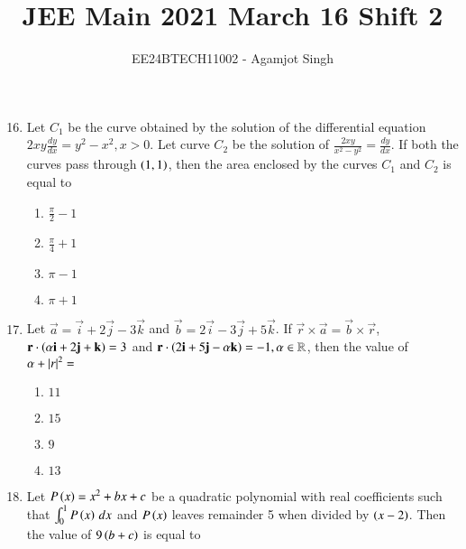 \documentclass[journal,onecolumn]{IEEEtran}
\theoremstyle{remark}
\begin{document}

\vspace{3cm}

\title{JEE Main 2021 March 16 Shift 2}
\author{EE24BTECH11002 - Agamjot Singh}
\maketitle

\renewcommand{\thefigure}{\theenumi}
\renewcommand{\thetable}{\theenumi}

\begin{enumerate}
    \setcounter{enumi}{15}

    \item Let $C_1$ be the curve obtained by the solution of the differential equation $2xy\frac{dy}{dx} = y^2 - x^2, x > 0$. Let curve $C_2$ be the solution of $\frac{2xy}{x^2 - y^2} = \frac{dy}{dx}$. If both the curves pass through $\left(1, 1\right)$, then the area enclosed by the curves $C_1$ and $C_2$ is equal to

	\begin{enumerate}
		\item $\frac{\pi}{2} - 1$
		\item $\frac{\pi}{4} + 1$
		\item $\pi - 1$
		\item $\pi + 1$
	\end{enumerate}

    \item Let $\vec{a} = \vec{i} + 2\vec{j} - 3\vec{k}$ and $\vec{b} = 2\vec{i} - 3\vec{j} + 5\vec{k}$. If $\vec{r} \times \vec{a} = \vec{b} \times \vec{r}$, $\mathbf{r} \cdot \left(\alpha\mathbf{i} + 2\mathbf{j} + \mathbf{k}\right) = 3$ and $\mathbf{r} \cdot \left(2\mathbf{i} + 5\mathbf{j} - \alpha\mathbf{k}\right) = -1, \alpha \in \mathbb{R}$, then the value of $\alpha + \left\vert r\right\vert^2 = $

	\begin{enumerate}
		\item $11$ 
		\item $15$
		\item $9$
		\item $13$
	\end{enumerate}

    \item Let $P\left(x\right) = x^2 + bx + c$ be a quadratic polynomial with real coefficients such that $\int_{0}^{1} P\left(x\right) \, dx$ and $P\left(x\right)$ leaves remainder 5 when divided by $\left(x - 2\right)$. Then the value of $9\left(b+c\right)$ is equal to


\end{enumerate}
\end{document}
